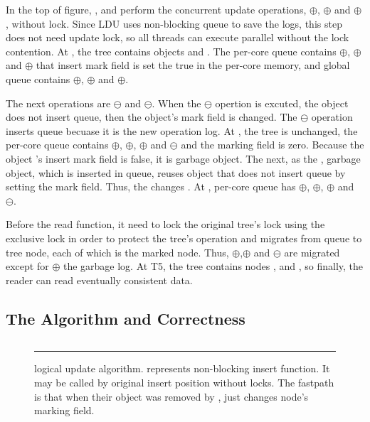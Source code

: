 In the top of figure, ,  and  perform the
concurrent update operations, $\oplus$, $\oplus$ and
$\oplus$, without lock.
Since LDU uses non-blocking queue to save the logs, this step does not need
update lock, so all threads can execute parallel without the lock contention.
At , the tree contains objects  and . 
The per-core queue contains $\oplus$, $\oplus$ and
$\oplus$ that insert mark field is set the true in the per-core
memory, and global queue contains $\oplus$, $\oplus$ and
$\oplus$.

The next operations are $\ominus$ and $\ominus$.
When the $\ominus$ opertion is excuted, the object does not insert
queue, then the object's mark field is changed. 
The $\ominus$ operation inserts queue becuase it is the new operation
log.
At , the tree is unchanged, the per-core queue
contains $\oplus$, $\oplus$, $\oplus$ and
$\ominus$ and the marking field is zero.
Because the object 's insert mark field is false, it is garbage
object.
The next, as the , garbage object, which is inserted in queue, reuses
object that does not insert queue by setting the mark field.
Thus, the  changes .
At , per-core queue has $\oplus$, $\oplus$,
$\oplus$ and $\ominus$.

Before the read function, it need to lock the original tree's lock using the
exclusive lock in order to protect the tree's operation and migrates from queue
to tree node, each of which is the marked node.
Thus, $\oplus$,$\oplus$ and $\ominus$ are
migrated except for $\oplus$ the garbage log.
At T5, the tree contains nodes  ,  and
, so finally, the reader can read eventually consistent data.


\subsection{The Algorithm and Correctness}

\begin{figure}[tb]
\begin{center}
\inputminted[linenos,fontsize=\footnotesize, tabsize=2]{c}{src/ldu_logical.c}
\end{center}
\rule{\columnwidth}{0.5pt}
\vspace{-\baselineskip}
\caption{ logical update algorithm.  represents
 non-blocking insert function.
It may be called by original insert position without locks. The fastpath is
 that when their object was removed by ,
  just changes node's marking field.}
\label{fig:gldulogicalupdate}
\end{figure}


